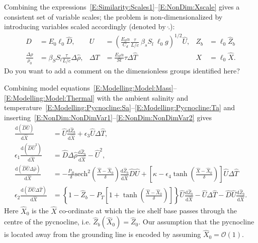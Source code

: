 \documentclass[openacc]{rsproca_new}%
\newcommand{\dd}[2]{\frac{\mathrm{d} #1}{\mathrm{d} #2}}
\newcommand{\order}[1]{\mathcal{O}(#1)}
\newcommand{\red}[1]{{\color{red} #1}}
\newcommand{\epsone}{\epsilon_{1}} %
\newcommand{\epstwo}{\epsilon_{2}} %
\newcommand{\epsthree}{\epsilon_{3}} %
\newcommand{\epsfour}{\epsilon_{4}}
\newcommand{\Pb}{\textit{P}_B}  %
\newcommand{\lt}{\delta} %
\newcommand{\Pt}{\textit{P}_T}
\begin{document}
Combining the expressions~\eqref{E:Similarity:Scales1}--\eqref{E:NonDim:Xscale} gives a consistent set of variable scales; the problem is non-dimensionalized by introducing variables scaled accordingly (denoted by  $\hat{.}$):
\begin{align}
D&= E_0 \ell_0 \hat{D}, & U&= \left(\frac{E_0 \alpha}{C_d} \frac{\tau}{L/c}~\beta_s S_l ~\ell_0  g\right)^{1/2}\hat{U}, & Z_b &= \ell_0 \hat{Z}_b\label{E:NonDim:NonDimVar1}\\
\frac{\Delta \rho}{\rho_0} &= \beta_S S_l \frac{\tau}{L/c}\Delta \hat{\rho}, & \Delta T &= \frac{E_0 \alpha}{St}\tau \Delta \hat{T} & X &=\ell_0\hat{X}. \label{E:NonDim:NonDimVar2}
\end{align}
\red{Do you want to add a comment on the dimensionless groups identified here?}
 \renewcommand{\lambda}{\kappa}

Combining model equations~\eqref{E:Modelling:Model:Mass}--\eqref{E:Modelling:Model:Thermal} with the ambient salinity and temperature~\eqref{E:Modelling:Pycnocline:Sa}--\eqref{E:Modelling:Pycnocline:Ta} and inserting~\eqref{E:NonDim:NonDimVar1}--\eqref{E:NonDim:NonDimVar2} gives
\begin{align}
\dd{(\hat{D}\hat{U})}{\hat{X}} &= \hat{U} \dd{\hat{Z}_b}{\hat{X}} +\epsthree \hat{U} \Delta \hat{T},\label{E:NonDim:mass}\\
\epsone \dd{(\hat{D}\hat{U}^2)}{\hat{X}} &= \hat{D} \Delta \hat{\rho} \dd{\hat{Z}_b}{\hat{X}} - \hat{U}^2,\label{E:NonDim:mom} \\
\dd{(\hat{D}\hat{U}\Delta \hat{\rho})}{\hat{X}}  &= -\frac{\Pb}{\delta} \mathrm{sech}^2\left(\frac{\hat{X} - \hat{X}_0}{\lt}\right)\dd{\hat{Z}_b}{\hat{X}} \hat{D}\hat{U}+
 \left[\lambda - \epsfour \tanh \left(\frac{\hat{X} - \hat{X}_0}{\lt}\right) \right] \hat{U} \Delta \hat{T}\label{E:NonDim:buoyancy} \\
\epstwo \dd{(\hat{D}\hat{U}\Delta \hat{T})}{\hat{X}} &= \left\{1 - \hat{Z}_b - \Pt\left[1 + \tanh\left(\frac{\hat{X} - \hat{X}_0}{\lt}\right)\right]\right\} \hat{U}\dd{\hat{Z}_b}{\hat{X}}  - \hat{U}\Delta \hat{T}- \hat{D}\hat{U}\dd{\hat{Z}_b}{\hat{X}}.\label{E:NonDim:thermal}
 \end{align}
Here $\hat{X}_0$ is the $\hat{X}$ co-ordinate at which the ice shelf base passes through the centre of the pycnocline, i.e. $\hat{Z}_b(\hat{X}_0) = \hat{Z}_0$. Our assumption that the pycnocline is located away from the grounding line is encoded by assuming $\hat{X}_0 = \order{1}$.
\end{document}
